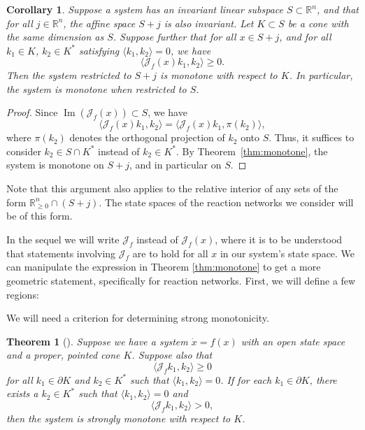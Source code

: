 \documentclass{article}
\newtheorem{cor}{Corollary}
\newtheorem{thm}{Theorem}
\begin{document}
\begin{cor}
Suppose a system has an invariant linear subspace \( S \subset \mathbb{R}^n \), and that for all \( j \in \mathbb{R}^n \), the affine space \( S + j \) is also invariant. Let \( K \subset S \) be a cone with the same dimension as \( S \). Suppose further that for all \( x \in S + j \), and for all \( k_1 \in K \), \( k_2 \in K^* \) satisfying \( \langle k_1, k_2 \rangle = 0 \), we have
\[
\langle \mathcal{J}_f(x) k_1, k_2 \rangle \geq 0.
\]
Then the system restricted to \( S + j \) is monotone with respect to \( K \). In particular, the system is monotone when restricted to \( S \).
\end{cor}

\begin{proof}
Since \( \operatorname{Im}(\mathcal{J}_f(x)) \subset S \), we have
\[
\langle \mathcal{J}_f(x) k_1, k_2 \rangle = \langle \mathcal{J}_f(x) k_1, \pi(k_2) \rangle,
\]
where \( \pi(k_2) \) denotes the orthogonal projection of \( k_2 \) onto \( S \). Thus, it suffices to consider \( k_2 \in S \cap K^* \) instead of \( k_2 \in K^* \). By Theorem~\ref{thm:monotone}, the system is monotone on \( S + j \), and in particular on \( S \).
\end{proof}



Note that this argument also applies to the relative interior of any sets of the form $\mathbb{R}^n_{\geq 0} \cap (S + j)$. The state spaces of the reaction networks we consider will be of this form.



In the sequel we will write $\mathcal{J}_f$ instead of $\mathcal{J}_f(x)$, where it is to be understood that statements involving $\mathcal{J}_f$ are to hold for all $x$ in our system's state space.  We can manipulate the expression in Theorem \ref{thm:monotone} to get a more geometric statement, specifically for reaction networks. First, we will define a few regions:

We will need a criterion for determining strong monotonicity.

\begin{thm}[{\cite[Theorem~3.6]{HIRSCH2006239}}]
\label{thm:strong monotone strengthened}
Suppose we have a system $\dot{x} = f(x)$ with an open state space and a proper, pointed cone $K$. Suppose also that
\[
\langle \mathcal{J}_f k_1, k_2 \rangle \geq 0
\]
for all $k_1 \in \partial K$ and $k_2 \in K^*$ such that $\langle k_1,k_2 \rangle = 0$. If for each $k_1 \in \partial K$, there exists a $k_2 \in K^*$ such that $\langle k_1,k_2 \rangle = 0$ and
\[
\langle \mathcal{J}_f k_1, k_2 \rangle > 0,
\]
then the system is strongly monotone with respect to $K$.
\end{thm}
\end{document}
